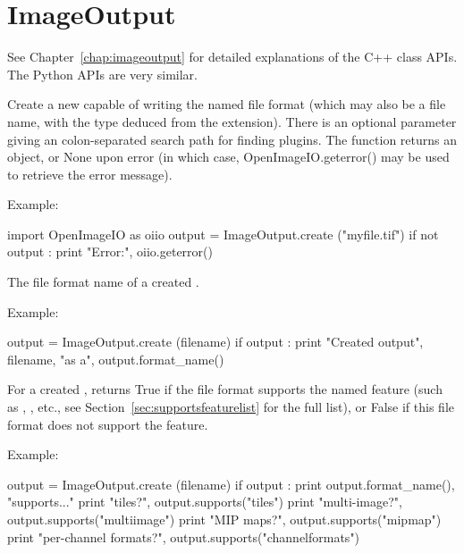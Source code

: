 \section{ImageOutput}
\label{sec:pythonimageoutput}

See Chapter~\ref{chap:imageoutput} for detailed explanations of the
C++ \ImageOutput class APIs. The Python APIs are very similar.


Create a new \ImageOutput capable of writing the named file format (which may
also be a file name, with the type deduced from the extension).  There
is an optional parameter giving an colon-separated search path for finding
\ImageOutput plugins.  The function returns an \ImageOutput object, or
{\cf None} upon error (in which case, {OpenImageIO.geterror()} may be used
to retrieve the error message).

\noindent Example:
\begin{code}
    import OpenImageIO as oiio
    output = ImageOutput.create ("myfile.tif")
    if not output :
        print "Error:", oiio.geterror()
\end{code}
\apiend

The file format name of a created \ImageOutput.

\noindent Example:
\begin{code}
    output = ImageOutput.create (filename)
    if output :
        print "Created output", filename, "as a", output.format_name()
\end{code}
\apiend

For a created \ImageOutput, returns {\cf True} if the file format supports
the named feature (such as , , etc., see
Section~\ref{sec:supportsfeaturelist} for the full list), or {\cf False}
if this file format does not support the feature.

\noindent Example:
\begin{code}
    output = ImageOutput.create (filename)
    if output :
        print output.format_name(), "supports..."
        print "tiles?", output.supports("tiles")
        print "multi-image?", output.supports("multiimage")
        print "MIP maps?", output.supports("mipmap")
        print "per-channel formats?", output.supports("channelformats")
\end{code}
\apiend

